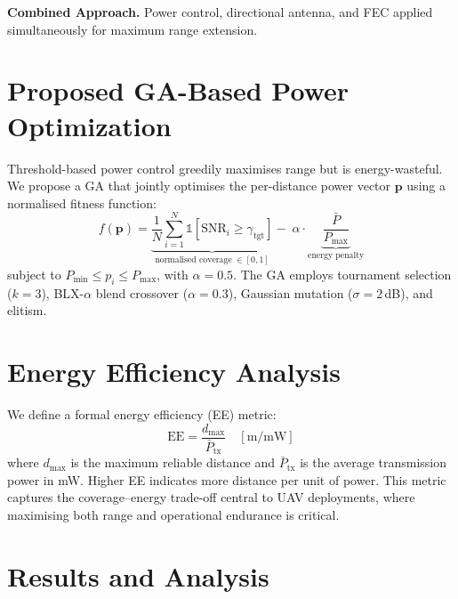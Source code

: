 \documentclass[conference]{IEEEtran}
\begin{document}
\textbf{Combined Approach.} Power control, directional antenna, and FEC applied simultaneously for maximum range extension.

\section{Proposed GA-Based Power Optimization}

Threshold-based power control greedily maximises range but is energy-wasteful. We propose a GA that jointly optimises the per-distance power vector $\mathbf{p}$ using a normalised fitness function:
\begin{equation}
f(\mathbf{p}) = \underbrace{\frac{1}{N}\sum_{i=1}^{N}\mathbb{1}[\text{SNR}_i \geq \gamma_\text{tgt}]}_{\text{normalised coverage}\;\in[0,1]} - \;\alpha\cdot\underbrace{\frac{\bar{P}}{P_\text{max}}}_{\text{energy penalty}}
\label{eq:fitness}
\end{equation}
subject to $P_\text{min}\leq p_i\leq P_\text{max}$, with $\alpha=0.5$. The GA employs tournament selection ($k\!=\!3$), BLX-$\alpha$ blend crossover ($\alpha\!=\!0.3$), Gaussian mutation ($\sigma\!=\!2$\,dB), and elitism.

\section{Energy Efficiency Analysis}

We define a formal energy efficiency (EE) metric:
\begin{equation}
\text{EE} = \frac{d_\text{max}}{\bar{P}_\text{tx}} \quad [\text{m/mW}]
\label{eq:ee}
\end{equation}
where $d_\text{max}$ is the maximum reliable distance and $\bar{P}_\text{tx}$ is the average transmission power in mW. Higher EE indicates more distance per unit of power. This metric captures the coverage--energy trade-off central to UAV deployments, where maximising both range and operational endurance is critical.

\section{Results and Analysis}
\end{document}

